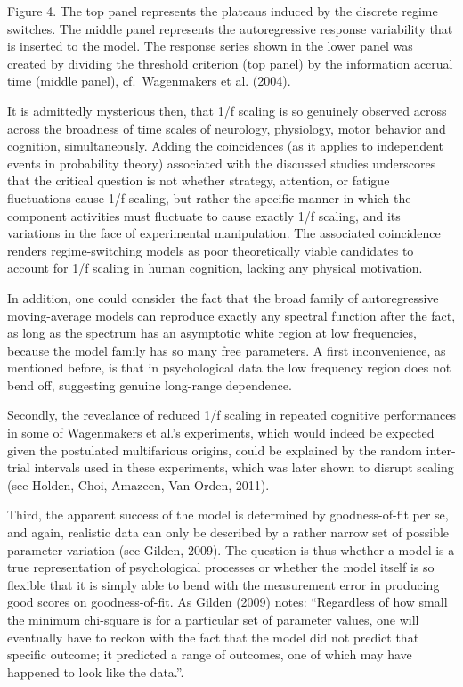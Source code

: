 \documentclass[12pt,]{book}
\begin{document}
Figure 4. The top panel represents the plateaus induced by the discrete regime switches. The middle panel represents the autoregressive response variability that is inserted to the model. The response series shown in the lower panel was created by dividing the threshold criterion (top panel) by the information accrual time (middle panel), cf.~Wagenmakers et al. (2004).

It is admittedly mysterious then, that 1/f scaling is so genuinely observed across across the broadness of time scales of neurology, physiology, motor behavior and cognition, simultaneously. Adding the coincidences (as it applies to independent events in probability theory) associated with the discussed studies underscores that the critical question is not whether strategy, attention, or fatigue fluctuations cause 1/f scaling, but rather the specific manner in which the component activities must fluctuate to cause exactly 1/f scaling, and its variations in the face of experimental manipulation. The associated coincidence renders regime-switching models as poor theoretically viable candidates to account for 1/f scaling in human cognition, lacking any physical motivation.

In addition, one could consider the fact that the broad family of autoregressive moving-average models can reproduce exactly any spectral function after the fact, as long as the spectrum has an asymptotic white region at low frequencies, because the model family has so many free parameters. A first inconvenience, as mentioned before, is that in psychological data the low frequency region does not bend off, suggesting genuine long-range dependence.

Secondly, the revealance of reduced 1/f scaling in repeated cognitive performances in some of Wagenmakers et al.'s experiments, which would indeed be expected given the postulated multifarious origins, could be explained by the random inter-trial intervals used in these experiments, which was later shown to disrupt scaling (see Holden, Choi, Amazeen, Van Orden, 2011).

Third, the apparent success of the model is determined by goodness-of-fit per se, and again, realistic data can only be described by a rather narrow set of possible parameter variation (see Gilden, 2009). The question is thus whether a model is a true representation of psychological processes or whether the model itself is so flexible that it is simply able to bend with the measurement error in producing good scores on goodness-of-fit. As Gilden (2009) notes: ``Regardless of how small the minimum chi-square is for a particular set of parameter values, one will eventually have to reckon with the fact that the model did not predict that specific outcome; it predicted a range of outcomes, one of which may have happened to look like the data.''.
\end{document}
